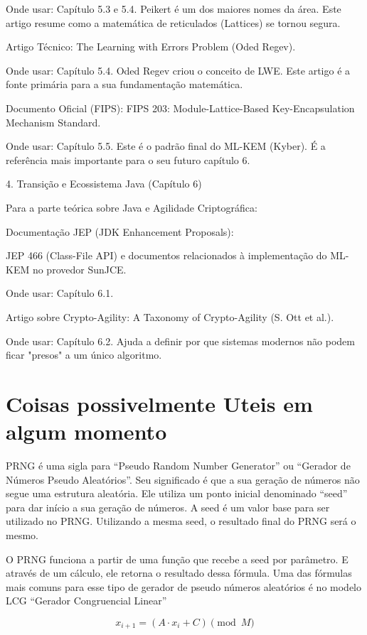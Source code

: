 \documentclass[
	12pt,				%
	openright,			%
	oneside,			%
	a4paper,			%
	portuguese,			%
	brazil				%
	]{abntex2}
\begin{document}
        Onde usar: Capítulo 5.3 e 5.4. Peikert é um dos maiores nomes da área. Este artigo resume como a matemática de reticulados (Lattices) se tornou segura.

    Artigo Técnico: The Learning with Errors Problem (Oded Regev).

        Onde usar: Capítulo 5.4. Oded Regev criou o conceito de LWE. Este artigo é a fonte primária para a sua fundamentação matemática.

    Documento Oficial (FIPS): FIPS 203: Module-Lattice-Based Key-Encapsulation Mechanism Standard.

        Onde usar: Capítulo 5.5. Este é o padrão final do ML-KEM (Kyber). É a referência mais importante para o seu futuro capítulo 6.

4. Transição e Ecossistema Java (Capítulo 6)

Para a parte teórica sobre Java e Agilidade Criptográfica:

    Documentação JEP (JDK Enhancement Proposals):

        JEP 466 (Class-File API) e documentos relacionados à implementação do ML-KEM no provedor SunJCE.

        Onde usar: Capítulo 6.1.

    Artigo sobre Crypto-Agility: A Taxonomy of Crypto-Agility (S. Ott et al.).

        Onde usar: Capítulo 6.2. Ajuda a definir por que sistemas modernos não podem ficar "presos" a um único algoritmo.

\chapter{Coisas possivelmente Uteis em algum momento}

PRNG é uma sigla para “Pseudo Random Number Generator” ou “Gerador de Números Pseudo Aleatórios”. 
Seu significado é que a sua geração de números não segue uma estrutura aleatória. 
Ele utiliza um ponto inicial denominado “seed” para dar início a sua geração de números. 
A seed é um valor base para ser utilizado no PRNG. 
Utilizando a mesma seed, o resultado final do PRNG será o mesmo.

O PRNG funciona a partir de uma função que recebe a seed por parâmetro. 
E através de um cálculo, ele retorna o resultado dessa fórmula. 
Uma das fórmulas mais comuns para esse tipo de gerador de pseudo números aleatórios é no modelo LCG “Gerador Congruencial Linear” 

\begin{equation}
    x_{i+1} = (A \cdot x_i + C) \pmod{M}
    \label{eq:lca}
\end{equation}
\end{document}
